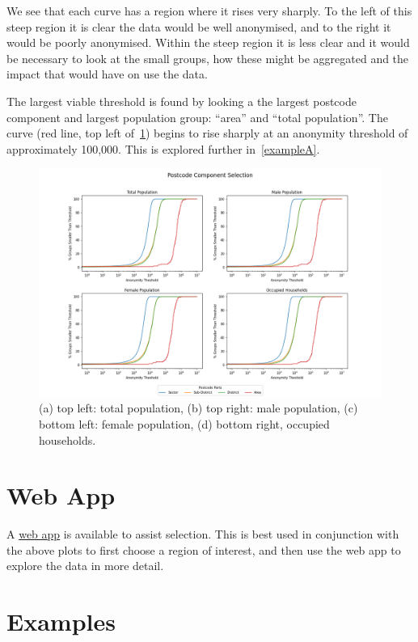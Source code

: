 \documentclass[12pt, a4paper]{article}
\begin{document}
We see that each curve has a region where it rises very sharply. To the left of this steep region it is clear the data would be well anonymised, and to the right it would be poorly anonymised. Within the steep region it is less clear and it would be necessary to look at the small groups, how these might be aggregated and the impact that would have on use the data.

The largest viable threshold is found by looking a the largest postcode component and largest population group: ``area'' and ``total population''. The curve (red line, top left of~\cref{fig:postcode_selection}) begins to rise sharply at an anonymity threshold of approximately 100,000. This is explored further in~\cref{exampleA}.

\begin{figure}
\includegraphics[width=1\textwidth,trim={3cm, 0cm, 3cm, 0cm},clip]{images/postcode_selection.png}
\caption{(a) top left: total population, (b) top right: male population, (c) bottom left: female population, (d) bottom right, occupied households.}\label{fig:postcode_selection}
\end{figure}

\section{Web App}\label{lookup-utlity}

A \href{https://share.streamlit.io/adhardy/mirador-task-sheet/main}{web app} is available to assist selection. This is best used in conjunction with the above plots to first choose a region of interest, and then use the web app to explore the data in more detail.

\section{Examples}
\end{document}
